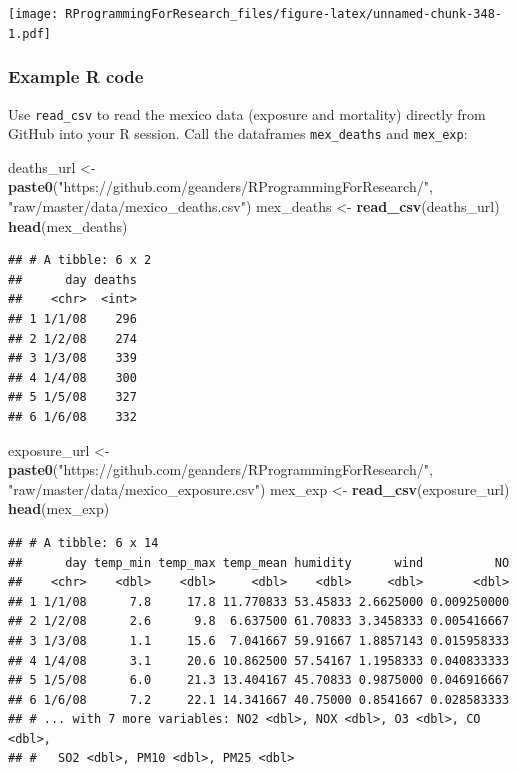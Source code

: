 \documentclass[]{book}
\makeatletter
\newenvironment{Shaded}{\begin{snugshade}}{\end{snugshade}}
\newcommand{\KeywordTok}[1]{\textcolor[rgb]{0.13,0.29,0.53}{\textbf{#1}}}
\newcommand{\StringTok}[1]{\textcolor[rgb]{0.31,0.60,0.02}{#1}}
\newcommand{\NormalTok}[1]{#1}
\newenvironment{kframe}{%
\medskip{}
\setlength{\fboxsep}{.8em}
 \def\at@end@of@kframe{}%
 \ifinner\ifhmode%
  \def\at@end@of@kframe{\end{minipage}}%
  \begin{minipage}{\columnwidth}%
 \fi\fi%
 \def\FrameCommand##1{\hskip\@totalleftmargin \hskip-\fboxsep
 \colorbox{shadecolor}{##1}\hskip-\fboxsep
     \hskip-\linewidth \hskip-\@totalleftmargin \hskip\columnwidth}%
 \MakeFramed {\advance\hsize-\width
   \@totalleftmargin\z@ \linewidth\hsize
   \@setminipage}}%
 {\par\unskip\endMakeFramed%
 \at@end@of@kframe}
\renewenvironment{Shaded}{\begin{kframe}}{\end{kframe}}
\theoremstyle{definition}
\theoremstyle{definition}
\theoremstyle{definition}
\theoremstyle{remark}
\makeatother
\begin{document}
\texttt{[image: RProgrammingForResearch\_files/figure-latex/unnamed-chunk-348-1.pdf]}

\subsubsection{Example R code}\label{example-r-code-10}

Use \texttt{read\_csv} to read the mexico data (exposure and mortality)
directly from GitHub into your R session. Call the dataframes
\texttt{mex\_deaths} and \texttt{mex\_exp}:

\begin{Shaded}
\begin{Highlighting}[]
\NormalTok{deaths_url <-}\StringTok{ }\KeywordTok{paste0}\NormalTok{(}\StringTok{"https://github.com/geanders/RProgrammingForResearch/"}\NormalTok{,}
                     \StringTok{"raw/master/data/mexico_deaths.csv"}\NormalTok{)}
\NormalTok{mex_deaths <-}\StringTok{ }\KeywordTok{read_csv}\NormalTok{(deaths_url)}
\KeywordTok{head}\NormalTok{(mex_deaths)}
\end{Highlighting}
\end{Shaded}

\begin{verbatim}
## # A tibble: 6 x 2
##      day deaths
##    <chr>  <int>
## 1 1/1/08    296
## 2 1/2/08    274
## 3 1/3/08    339
## 4 1/4/08    300
## 5 1/5/08    327
## 6 1/6/08    332
\end{verbatim}

\begin{Shaded}
\begin{Highlighting}[]
\NormalTok{exposure_url <-}\StringTok{ }\KeywordTok{paste0}\NormalTok{(}\StringTok{"https://github.com/geanders/RProgrammingForResearch/"}\NormalTok{,}
                       \StringTok{"raw/master/data/mexico_exposure.csv"}\NormalTok{)}
\NormalTok{mex_exp <-}\StringTok{ }\KeywordTok{read_csv}\NormalTok{(exposure_url)}
\KeywordTok{head}\NormalTok{(mex_exp)}
\end{Highlighting}
\end{Shaded}

\begin{verbatim}
## # A tibble: 6 x 14
##      day temp_min temp_max temp_mean humidity      wind          NO
##    <chr>    <dbl>    <dbl>     <dbl>    <dbl>     <dbl>       <dbl>
## 1 1/1/08      7.8     17.8 11.770833 53.45833 2.6625000 0.009250000
## 2 1/2/08      2.6      9.8  6.637500 61.70833 3.3458333 0.005416667
## 3 1/3/08      1.1     15.6  7.041667 59.91667 1.8857143 0.015958333
## 4 1/4/08      3.1     20.6 10.862500 57.54167 1.1958333 0.040833333
## 5 1/5/08      6.0     21.3 13.404167 45.70833 0.9875000 0.046916667
## 6 1/6/08      7.2     22.1 14.341667 40.75000 0.8541667 0.028583333
## # ... with 7 more variables: NO2 <dbl>, NOX <dbl>, O3 <dbl>, CO <dbl>,
## #   SO2 <dbl>, PM10 <dbl>, PM25 <dbl>
\end{verbatim}
\end{document}
